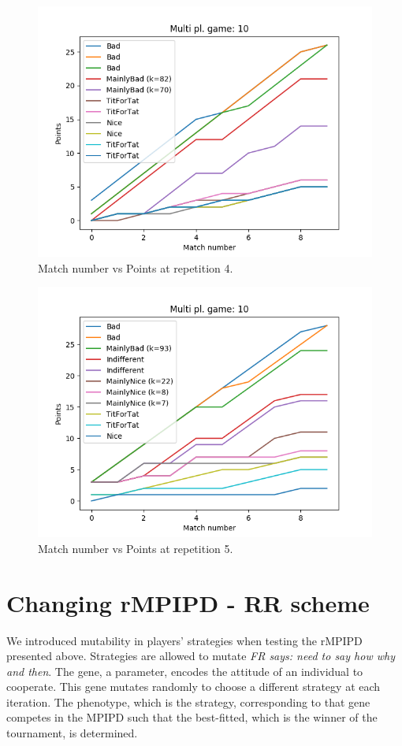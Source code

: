 \documentclass[journal,a4paper,10pt,twoside]{IEEEtran}
\newcommand{\FR}[1]{\textit{\color{ForestGreen}FR says: #1}}
\begin{document}
\begin{figure}[ht]
    \centering
    \includegraphics[width=1\columnwidth]{../img/ripdmp-scores-10-r3.png}
    \caption{Match number vs Points at repetition 4.}
    \label{fig:rmpipd4}
\end{figure}

\begin{figure}[ht]
    \centering
    \includegraphics[width=1\columnwidth]{../img/ripdmp-scores-10-r4.png}
    \caption{Match number vs Points at repetition 5.}
    \label{fig:rmpipd5}
\end{figure}

\newpage
\section{Changing rMPIPD - RR scheme} \label{s:crIPDMP}
We introduced mutability in players' strategies when testing the rMPIPD presented above.
Strategies are allowed to mutate \FR{need to say how why and then}.
The gene, a parameter, encodes the attitude of an individual to cooperate. This gene mutates randomly to choose a different strategy at each iteration. The phenotype, which is the strategy, corresponding to that gene competes in the MPIPD such that the best-fitted, which is the winner of the tournament, is determined.
\end{document}
